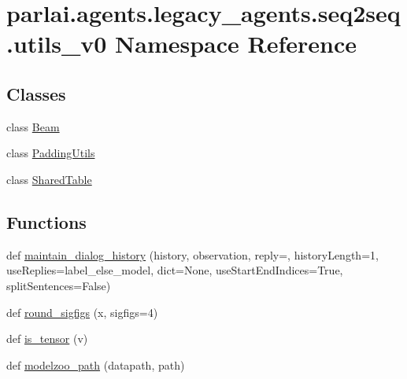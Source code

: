 \hypertarget{namespaceparlai_1_1agents_1_1legacy__agents_1_1seq2seq_1_1utils__v0}{}\section{parlai.\+agents.\+legacy\+\_\+agents.\+seq2seq.\+utils\+\_\+v0 Namespace Reference}
\label{namespaceparlai_1_1agents_1_1legacy__agents_1_1seq2seq_1_1utils__v0}
\subsection*{Classes}
\begin{DoxyCompactItemize}
\item 
class \hyperlink{classparlai_1_1agents_1_1legacy__agents_1_1seq2seq_1_1utils__v0_1_1Beam}{Beam}
\item 
class \hyperlink{classparlai_1_1agents_1_1legacy__agents_1_1seq2seq_1_1utils__v0_1_1PaddingUtils}{Padding\+Utils}
\item 
class \hyperlink{classparlai_1_1agents_1_1legacy__agents_1_1seq2seq_1_1utils__v0_1_1SharedTable}{Shared\+Table}
\end{DoxyCompactItemize}
\subsection*{Functions}
\begin{DoxyCompactItemize}
\item 
def \hyperlink{namespaceparlai_1_1agents_1_1legacy__agents_1_1seq2seq_1_1utils__v0_ac7cb3ffae208474d6e67f37ecfe07f64}{maintain\+\_\+dialog\+\_\+history} (history, observation, reply=\textquotesingle{}\textquotesingle{}, history\+Length=1, use\+Replies=\textquotesingle{}label\+\_\+else\+\_\+model\textquotesingle{}, dict=None, use\+Start\+End\+Indices=True, split\+Sentences=False)
\item 
def \hyperlink{namespaceparlai_1_1agents_1_1legacy__agents_1_1seq2seq_1_1utils__v0_af377ec61bfc0423461e7b409ffc883b9}{round\+\_\+sigfigs} (x, sigfigs=4)
\item 
def \hyperlink{namespaceparlai_1_1agents_1_1legacy__agents_1_1seq2seq_1_1utils__v0_a96c8bd68b645f94b1257c37f8c5646f5}{is\+\_\+tensor} (v)
\item 
def \hyperlink{namespaceparlai_1_1agents_1_1legacy__agents_1_1seq2seq_1_1utils__v0_a5fbd3301b67f00d6d146fb01c7cd7626}{modelzoo\+\_\+path} (datapath, path)
\end{DoxyCompactItemize}


